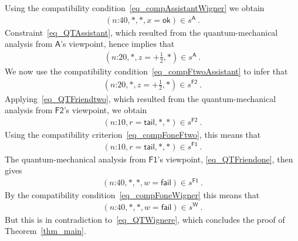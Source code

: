 \documentclass[12pt]{article}
\theoremstyle{plain}
\theoremstyle{definition}
\newcommand*{\Friendone}{\mathsf{F1}}
\newcommand*{\Friendtwo}{\mathsf{F2}}
\newcommand*{\Assistant}{\mathsf{A}}
\newcommand*{\Wigner}{\mathsf{W}}
\newcommand*{\sminus}{{\textstyle - \frac{1}{2}}}
\newcommand*{\splus}{{\textstyle + \frac{1}{2}}}
\newcommand*{\ok}{\mathsf{ok}}
\newcommand*{\fail}{\mathsf{fail}}
\newcommand*{\tail}{\mathsf{tail}}
\begin{document}
Using the compatibility condition~\eqref{eq_compAssistantWigner} we obtain
\begin{align*}
  (\text{$n$:40}, *, *,  x = \ok) \in s^{\Assistant}   \ .
\end{align*} 
 Constraint~\eqref{eq_QTAssistant}, which resulted from the quantum-mechanical analysis from $\Assistant$'s viewpoint, hence implies that  
\begin{align*}
    (\text{$n$:20}, *, z=\splus,  *) \in s^{\Assistant}   \ .
\end{align*}
We now use the compatibility condition~\eqref{eq_compFtwoAssistant}  to infer that
\begin{align*}
      (\text{$n$:20}, *, z=\splus,  *) \in s^{\Friendtwo}  \ .
\end{align*}
Applying~\eqref{eq_QTFriendtwo}, which resulted from the quantum-mechanical analysis from $\Friendtwo$'s viewpoint, we obtain 
\begin{align*} 
 (\text{$n$:10}, r = \tail, *, *) \in s^{\Friendtwo} \ .
\end{align*}
Using the compatibility criterion~\eqref{eq_compFoneFtwo}, this means that 
\begin{align} \label{eq_rtail}
 (\text{$n$:10}, r=\tail, *, *) \in s^{\Friendone}  \ .
\end{align}
The quantum-mechanical analysis from $\Friendone$'s viewpoint, \eqref{eq_QTFriendone}, then gives
\begin{align*}
 (\text{$n$:40},  *, *, w=\fail) \in s^{\Friendone}  \ .
\end{align*} 
By the compatibility condition~\eqref{eq_compFoneWigner} this means that
\begin{align*}
  (\text{$n$:40}, *, *, w=\fail ) \in s^{\Wigner} \ .
\end{align*}
But this is in contradiction to~\eqref{eq_QTWignere}, which concludes the proof of Theorem~\ref{thm_main}. 
\end{document}
